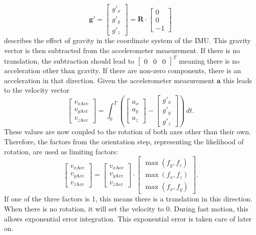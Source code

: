\documentclass[letterpaper, 10 pt, conference]{ieeeconf}  %
\newcommand{\M}[1]{\mathbf{#1}} %
\newcommand{\V}[1]{\mathbf{#1}} %
\begin{document}
\begin{equation}
\V g\V '=\begin{bmatrix}
g'_x\\
g'_y\\
g'_z
\end{bmatrix}
= \M R \cdot \begin{bmatrix}
0 \\0  \\ - 1
\end{bmatrix}
\end{equation}
describes the effect of gravity in the coordinate system of the IMU.
This gravity vector is then subtracted from the accelerometer measurement. If there is no translation, the subtraction should lead to $\begin{bmatrix}
0 & 0&0
\end{bmatrix}^T$ meaning there is no acceleration other than gravity. If there are non-zero components, there is an acceleration in that direction. Given the accelerometer measurement $\V a$ this leads to the velocity vector
\begin{equation}
\begin{bmatrix}
v_{x\text{Acc}} \\ v_{y\text{Acc}} \\v_{z\text{Acc}} 
\end{bmatrix}
= 
\int_0^T \left(\begin{bmatrix}
a_x \\ a_y \\ a_z
\end{bmatrix} 
-  \begin{bmatrix}
g'_x\\
g'_y\\
g'_z
\end{bmatrix} \right)\, dt.
\end{equation}
These values are now coupled to the rotation of both axes other than their own.
Therefore, the factors from the orientation step, representing the likelihood of rotation, are used as limiting factors:
\begin{equation}
\begin{bmatrix}
v_{x\text{Acc}} \\ v_{y\text{Acc}} \\v_{z\text{Acc}} 
\end{bmatrix}
 = \begin{bmatrix}
v_{x\text{Acc}} \\ v_{y\text{Acc}} \\v_{z\text{Acc}} 
\end{bmatrix}  \cdot 
\begin{bmatrix}
\max(f_y, f_z) \\ \max(f_x, f_z) \\ \max(f_x, f_y) 
\end{bmatrix}.
\end{equation}
If one of the three factors is 1, this means there is a translation in this direction.
When there is no rotation, it will set the velocity to 0.
During fast motion, this allows exponential error integration. 
This exponential error is taken care of later on.
\end{document}
